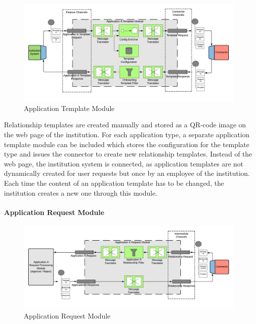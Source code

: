 \begin{figure}[H]
    \centering
    \includegraphics[scale=0.6]{Diagrams/Integration Architecture 2/Technological Integration/4. Application Template Module.pdf}
    \caption{Application Template Module}
    \label{integration2:application_template_module}
\end{figure}

Relationship templates are created manually and stored as a QR-code image on the web page of the institution. For each application type, a separate application template module can be included which stores the configuration for the template type and issues the connector to create new relationship templates. Instead of the web page, the institution system is connected, as application templates are not dynamically created for user requests but once by an employee of the institution. Each time the content of an application template has to be changed, the institution creates a new one through this module.

\paragraph{Application Request Module}

\begin{figure}[H]
    \centering
    \includegraphics[scale=0.6]{Diagrams/Integration Architecture 2/Technological Integration/5. Application Request Module.pdf}
    \caption{Application Request Module}
    \label{integration2:application_request_module}
\end{figure}

